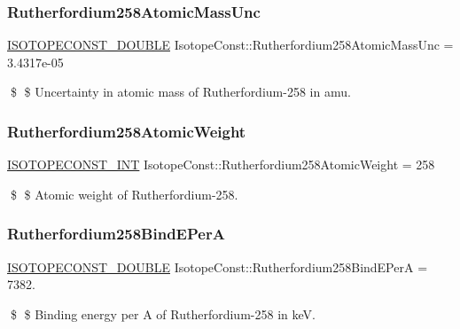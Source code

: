 \subsubsection{\texorpdfstring{Rutherfordium258\+Atomic\+Mass\+Unc}{Rutherfordium258AtomicMassUnc}}
{\footnotesize\ttfamily \mbox{\hyperlink{group___isotope_const-_macros_ga8f45a7272ce02c0b4c65c44636ed719a}{I\+S\+O\+T\+O\+P\+E\+C\+O\+N\+S\+T\+\_\+\+D\+O\+U\+B\+LE}} Isotope\+Const\+::\+Rutherfordium258\+Atomic\+Mass\+Unc = 3.\+4317e-\/05}

\$ \$ Uncertainty in atomic mass of Rutherfordium-\/258 in amu. \mbox{\label{group___isotope_const-_rutherfordium-_rf258_ga4e95be114a773b6bae4e256ca2ef074b}} 
\subsubsection{\texorpdfstring{Rutherfordium258\+Atomic\+Weight}{Rutherfordium258AtomicWeight}}
{\footnotesize\ttfamily \mbox{\hyperlink{group___isotope_const-_macros_ga5f18360b3e99483a35c32d789e62621c}{I\+S\+O\+T\+O\+P\+E\+C\+O\+N\+S\+T\+\_\+\+I\+NT}} Isotope\+Const\+::\+Rutherfordium258\+Atomic\+Weight = 258}

\$ \$ Atomic weight of Rutherfordium-\/258. \mbox{\label{group___isotope_const-_rutherfordium-_rf258_ga36052d812d781cc29deab2630e44ff66}} 
\subsubsection{\texorpdfstring{Rutherfordium258\+Bind\+E\+PerA}{Rutherfordium258BindEPerA}}
{\footnotesize\ttfamily \mbox{\hyperlink{group___isotope_const-_macros_ga8f45a7272ce02c0b4c65c44636ed719a}{I\+S\+O\+T\+O\+P\+E\+C\+O\+N\+S\+T\+\_\+\+D\+O\+U\+B\+LE}} Isotope\+Const\+::\+Rutherfordium258\+Bind\+E\+PerA = 7382.}

\$ \$ Binding energy per A of Rutherfordium-\/258 in keV. \mbox{\label{group___isotope_const-_rutherfordium-_rf258_gafa8544391fc252509c95faf8fa7879a5}} 
